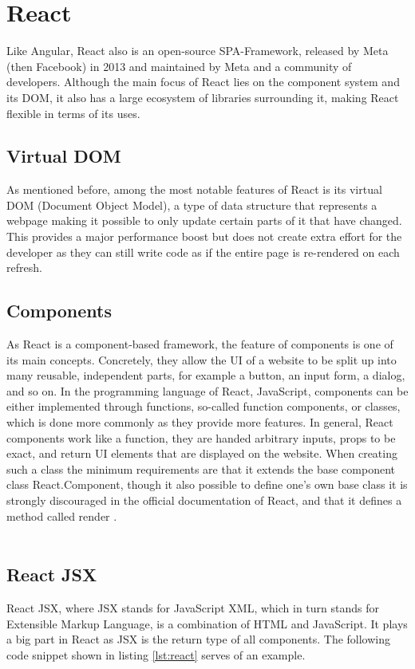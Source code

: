 \section{React}
Like Angular, React also is an open-source SPA-Framework, released by Meta (then Facebook) in 2013 and maintained by
Meta and a community of developers. Although the main focus of React lies on the component system and its DOM, it also 
has a large ecosystem of libraries surrounding it, making React flexible in terms of its uses.

\subsection{Virtual DOM}
As mentioned before, among the most notable features of React is its virtual DOM (Document Object Model), a type of 
data structure that represents a webpage making it possible to only update certain parts of it that have changed. 
This provides a major performance boost but does not create extra effort for the developer as they can still write 
code as if the entire page is re-rendered on each refresh.

\subsection{Components}
As React is a component-based framework, the feature of components is one of its main concepts. Concretely, they
allow the UI of a website to be split up into many reusable, independent parts,
for example a button, an input form, a dialog, and so on. In the programming language of React, JavaScript,
components can be either implemented through functions, so-called function components, or classes, which is done 
more commonly as they provide more features. In general, React components work like a function, they are handed 
arbitrary inputs, props to be exact, and return UI elements that are displayed on the website. When creating 
such a class the minimum requirements are that it extends the base component class React.Component, though it 
also possible to define one's own base class it is strongly discouraged in the official documentation of React,
and that it defines a method called render \cite{ReactComponentProps} \cite{ReactComponent}.
\\
\\
\subsection{React JSX}
React JSX, where JSX stands for JavaScript XML, which in turn stands for Extensible Markup Language, is a combination
of HTML and JavaScript. It plays a big part in React as JSX is the return type of all components. The following 
code snippet shown in listing \ref{lst:react} serves of an example.

